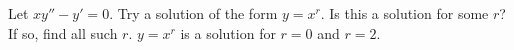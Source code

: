 {Let $xy'' - y' = 0$.  Try a solution of the form $y = x^r$.  Is this a
solution for some $r$?  If so, find all such $r$.}
{$y=x^r$ is a solution for $r=0$ and $r=2$.}